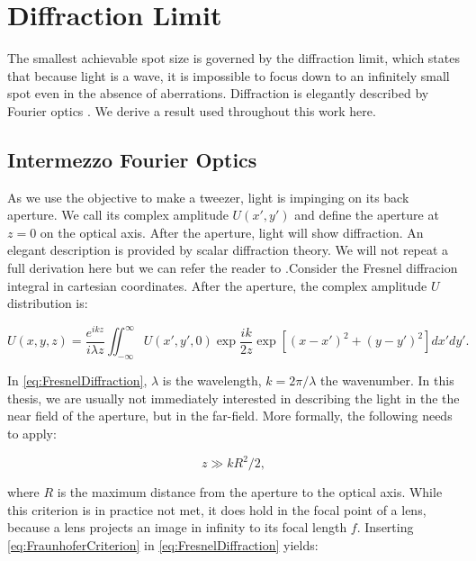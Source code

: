 \section{Diffraction Limit}

The smallest achievable spot size is governed by the diffraction limit, which states that because light is a wave, it is impossible to focus down to an infinitely small spot even in the absence of aberrations. Diffraction is elegantly described by Fourier optics \cite{Goodman2005}. We derive a result used throughout this work here.

\begin{mdframed}
    \subsection*{Intermezzo Fourier Optics}
    
    As we use the objective to make a tweezer, light is impinging on its back aperture. We call its complex amplitude $U(x',y')$ and define the aperture at $z = 0$ on the optical axis. After the aperture, light will show diffraction. An elegant description is provided by scalar diffraction theory. We will not repeat a full derivation here but we can refer the reader to \cite{Goodman2005}.Consider the Fresnel diffracion integral in cartesian coordinates. After the aperture, the complex amplitude $U$ distribution is:
    
    \begin{equation}\label{eq:FresnelDiffraction}
        U(x,y,z) = 
        \frac{e^{ikz}}{i \lambda z} \iint_{-\infty}^{\infty} U(x',y',0) \exp{\frac{ik}{2z}} \exp{\left[(x-x')^2+(y-y')^2\right]} dx'dy'.
    \end{equation}
    
    In \cref{eq:FresnelDiffraction}, $\lambda$ is the wavelength, $k=2\pi/\lambda$ the wavenumber. In this thesis, we are usually not immediately interested in describing the light in the the near field of the aperture, but in the far-field. More formally, the following needs to apply:
    
    \begin{equation}\label{eq:FraunhoferCriterion}
        z \gg k R^2/2,
    \end{equation}
    
    where $R$ is the maximum distance from the aperture to the optical axis. While this criterion is in practice not met, it does hold in the focal point of a lens, because a lens projects an image in infinity to its focal length $f$. Inserting \cref{eq:FraunhoferCriterion} in \cref{eq:FresnelDiffraction} yields:
    

\end{mdframed}
